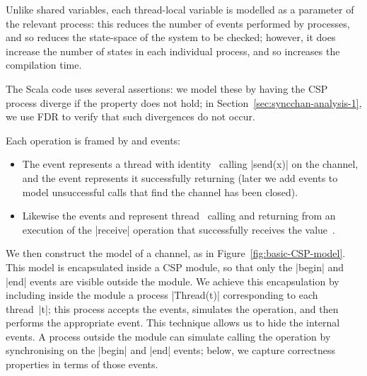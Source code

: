Unlike shared variables, each thread-local variable is modelled as a parameter
of the relevant process: this reduces the number of events performed by
processes, and so reduces the state-space of the system to be checked;
however, it does increase the number of states in each individual process, and
so increases the compilation time.

The Scala code uses several assertions: we model these by having the CSP
process diverge if the property does not hold; in
Section~\ref{sec:syncchan-analysis-1}, we use FDR to verify that such
divergences do not occur.

Each operation is framed by  and  events:
%
\begin{itemize}
\item The event  represents a thread with
  identity~ calling |send(x)| on the channel, and the event
   represents it successfully returning (later we
  add events to model unsuccessful calls that find the channel has
  been closed).

\item Likewise the events  and
   represent thread~ calling and
  returning from an execution of the |receive| operation that successfully
  receives the value~.
\end{itemize}
%

We then construct the model of a channel, as in
Figure~\ref{fig:basic-CSP-model}.  This model is encapsulated inside a CSP
module, so that only the |begin| and |end| events are visible outside the
module.  We achieve this encapsulation by including inside the module a
process |Thread(t)| corresponding to each thread~|t|; this process accepts the
 events, simulates the operation, and then performs the
appropriate  event.  This technique allows us to hide the internal
events.  A process outside the module can simulate calling the operation by
synchronising on the |begin| and |end| events; below, we capture correctness
properties in terms of those events.



